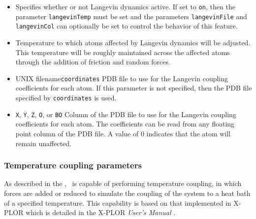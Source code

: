 \begin{itemize}

\item
{}
{Specifies whether or not Langevin dynamics active.  
If set to \verb!on!, then the parameter \verb!langevinTemp! must be set 
and the parameters \verb!langevinFile! and \verb!langevinCol! can
optionally be set to control the behavior of this feature.} 

\item
{}
{Temperature to which atoms affected by Langevin dynamics will be adjusted.  
This temperature will be roughly maintained across the affected atoms 
through the addition of friction and random forces.}

\item
{}%
{UNIX filename}{\verb!coordinates!}
{PDB file to use for the Langevin coupling coefficients for each atom.  
If this parameter is not specified, then 
the PDB file specified by \verb!coordinates! is used.}

\item
{}
{\verb!X!, \verb!Y!, \verb!Z!, \verb!O!, or \verb!B!}{\verb!O!} 
{Column of the PDB file to use for the Langevin coupling coefficients for 
each atom.  The coefficients can be read from any 
floating point column of the PDB file.  
A value of 0 indicates that the atom will remain unaffected.}

\end{itemize}

\subsubsection{Temperature coupling parameters}

As described in the \PG, \NAMD\ is capable
of performing temperature coupling, in which forces are added or 
reduced to simulate the coupling of the system to a heat bath 
of a specified temperature.  
This capability is based on that implemented in X-PLOR which is detailed
in the X-PLOR {\it User's Manual} .

